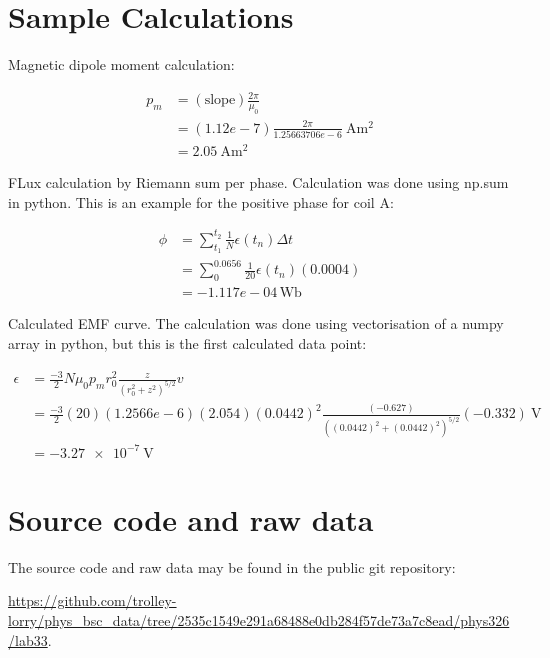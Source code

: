\section{Sample Calculations}\label{sec:sample-calculations}

Magnetic dipole moment calculation:

\begin{align}
    p_m &= (\text{slope}) \frac{2 \pi}{\mu_0} \\
    &= (1.12e-7) \frac{2 \pi}{1.25663706e-6} \qty{}{\ampere\meter^2} \\
    &= \qty{2.05}{\ampere\meter^2}
\end{align}

FLux calculation by Riemann sum per phase.
Calculation was done using np.sum in python.
This is an example for the positive phase for coil A:

\begin{align}
    \phi &= \sum_{t_1}^{t_2} \frac{1}{N}\epsilon(t_n) \Delta t \\
    &= \sum_{0}^{0.0656} \frac{1}{20}\epsilon(t_n) (0.0004) \\
    &= -1.117e-04 \, \text{Wb}
\end{align}

Calculated EMF curve.
The calculation was done using vectorisation of a numpy array in python, but this is the first calculated data point:

\begin{align}
    \epsilon &= \frac{-3}{2} N \mu_0 p_m r_0^2 \frac{z}{(r_0^2 + z^2)^{5/2}} v \\
    &= \frac{-3}{2} (20) (1.2566e-6) (2.054) (0.0442)^2 \frac{(-0.627)}{((0.0442)^2 + (0.0442)^2)^{5/2}} (-0.332) \qty{}{\volt} \\
    &= \qty{-3.27e-7}{\volt}
\end{align}

\section{Source code and raw data}\label{sec:source-code-and-raw-data}

The source code and raw data may be found in the public git repository:

\url{https://github.com/trolley-lorry/phys_bsc_data/tree/2535c1549e291a68488e0db284f57de73a7c8ead/phys326/lab33}.
